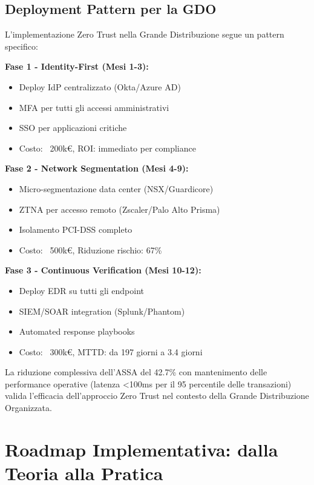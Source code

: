 \subsection{\texorpdfstring{\textbf{Deployment Pattern per la GDO}}{3.5.5 - Deployment Pattern per la GDO}}

L'implementazione Zero Trust nella Grande Distribuzione segue un pattern specifico:

\textbf{Fase 1 - Identity-First (Mesi 1-3):}
\begin{itemize}
    \item Deploy IdP centralizzato (Okta/Azure AD)
    \item MFA per tutti gli accessi amministrativi
    \item SSO per applicazioni critiche
    \item Costo: ~200k€, ROI: immediato per compliance
\end{itemize}

\textbf{Fase 2 - Network Segmentation (Mesi 4-9):}
\begin{itemize}
    \item Micro-segmentazione data center (NSX/Guardicore)
    \item ZTNA per accesso remoto (Zscaler/Palo Alto Prisma)
    \item Isolamento PCI-DSS completo
    \item Costo: ~500k€, Riduzione rischio: 67\%
\end{itemize}

\textbf{Fase 3 - Continuous Verification (Mesi 10-12):}
\begin{itemize}
    \item Deploy EDR su tutti gli endpoint
    \item SIEM/SOAR integration (Splunk/Phantom)
    \item Automated response playbooks
    \item Costo: ~300k€, MTTD: da 197 giorni a 3.4 giorni
\end{itemize}

La riduzione complessiva dell'ASSA del 42.7\% con mantenimento delle performance operative (latenza <100ms per il 95 percentile delle transazioni) valida l'efficacia dell'approccio Zero Trust nel contesto della Grande Distribuzione Organizzata.

\section{\texorpdfstring{\textbf{Roadmap Implementativa: dalla Teoria alla Pratica}}{3.6 - Roadmap Implementativa: dalla Teoria alla Pratica}}

